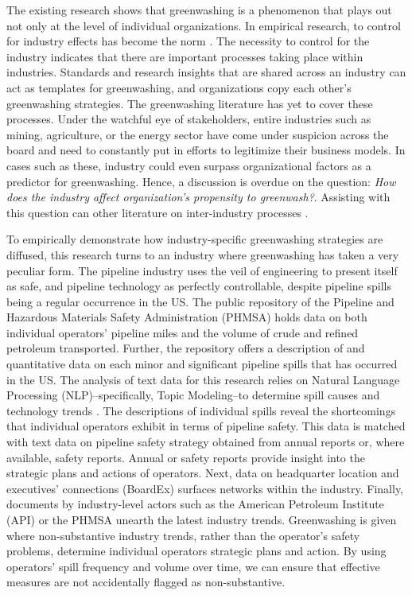 The existing research shows that greenwashing is a phenomenon that plays out not only at the level of individual organizations. In empirical research, to control for industry effects has become the norm \citep[e.g.,][]{Ramus2005, Marquis2016, Du2015, Testa2018}. The necessity to control for the industry indicates that there are important processes taking place within industries. Standards and research insights that are shared across an industry can act as templates for greenwashing, and organizations copy each other's greenwashing strategies. The greenwashing literature has yet to cover these processes. Under the watchful eye of stakeholders, entire industries such as mining, agriculture, or the energy sector have come under suspicion across the board and need to constantly put in efforts to legitimize their business models. In cases such as these, industry could even surpass organizational factors as a predictor for greenwashing. Hence, a discussion is overdue on the question: \textit{How does the industry affect organization's propensity to greenwash?}. Assisting with this question can other literature on inter-industry processes \citep[such as][]{Maguire2009, Hardy2020}.

To empirically demonstrate how industry-specific greenwashing strategies are diffused, this research turns to an industry where greenwashing has taken a very peculiar form. The pipeline industry uses the veil of engineering to present itself as safe, and pipeline technology as perfectly controllable, despite pipeline spills being a regular occurrence in the US. The public repository of the Pipeline and Hazardous Materials Safety Administration (PHMSA) holds data on both individual operators' pipeline miles and the volume of crude and refined petroleum transported. Further, the repository offers a description of and quantitative data on each minor and significant pipeline spills that has occurred in the US. The analysis of text data for this research relies on Natural Language Processing (NLP)--specifically, Topic Modeling--to determine spill causes and technology trends \citep{Hannigan2019}. The descriptions of individual spills reveal the shortcomings that individual operators exhibit in terms of pipeline safety. This data is matched with text data on pipeline safety strategy obtained from annual reports or, where available, safety reports. Annual or safety reports provide insight into the strategic plans and actions of operators. Next, data on headquarter location and executives' connections (BoardEx) surfaces networks within the industry. Finally, documents by industry-level actors such as the American Petroleum Institute (API) or the PHMSA unearth the latest industry trends. Greenwashing is given where non-substantive industry trends, rather than the operator's safety problems, determine individual operators strategic plans and action. By using operators' spill frequency and volume over time, we can ensure that effective measures are not accidentally flagged as non-substantive.

